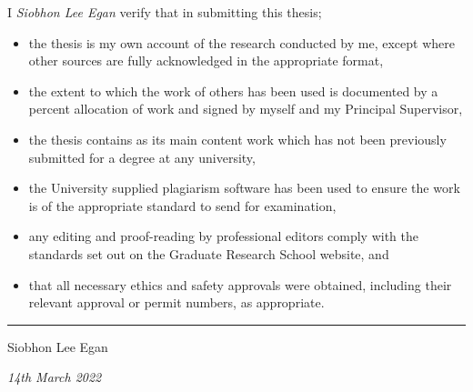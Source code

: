 \documentclass[a4paper, nobind]{templates/ociamthesis}
\providecommand{\tightlist}{%
  \setlength{\itemsep}{0pt}\setlength{\parskip}{0pt}}
\begin{document}
\begin{romanpages}


\begin{declaration}
 	I \emph{Siobhon Lee Egan} verify that in submitting this thesis;

  \begin{itemize}
  \tightlist
  \item
    the thesis is my own account of the research conducted by me, except where other sources are fully acknowledged in the appropriate format,
  \item
    the extent to which the work of others has been used is documented by a percent allocation of work and signed by myself and my Principal Supervisor,
  \item
    the thesis contains as its main content work which has not been previously submitted for a degree at any university,
  \item
    the University supplied plagiarism software has been used to ensure the work is of the appropriate standard to send for examination,
  \item
    any editing and proof-reading by professional editors comply with the standards set out on the Graduate Research School website, and
  \item
    that all necessary ethics and safety approvals were obtained, including their relevant approval or permit numbers, as appropriate.
  \end{itemize}

  \vspace{3mm}

  \raggedright

  \begin{center}\rule{0.5\linewidth}{0.5pt}\end{center}

  Siobhon Lee Egan

  \emph{14th March 2022}
\end{declaration}


  \dominitoc %

\flushbottom

\tableofcontents


\end{romanpages}
\end{document}
